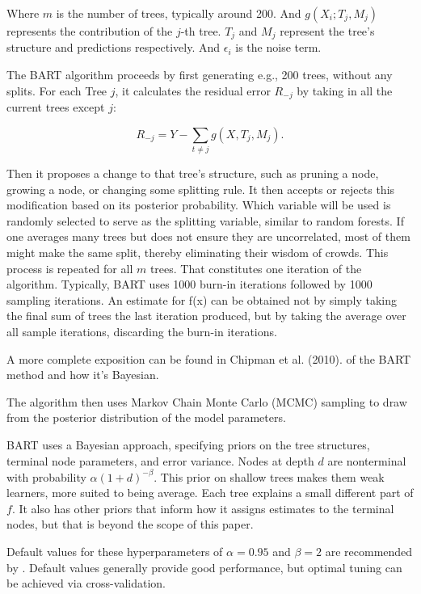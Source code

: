 \documentclass[12pt]{article}
\begin{document}
Where $m$ is the number of trees, typically around 200. And $g(X_i; T_j, M_j)$ represents the contribution of the $j$-th tree. $T_j$ and $M_j$ represent the tree's structure and predictions respectively. And $\epsilon_i$ is the noise term.

The BART algorithm proceeds by first generating e.g., 200 trees, without any splits. For each Tree $j$, it calculates the residual error $R_{-j}$ by taking in all the current trees except $j$:

\begin{equation}
    R_{-j} = Y - \sum_{t\not=j} g(X,T_j,M_j).
\end{equation}

Then it proposes a change to that tree's structure, such as pruning a node, growing a node, or changing some splitting rule. It then accepts or rejects this modification based on its posterior probability. Which variable will be used is randomly selected to serve as the splitting variable, similar to random forests. If one averages many trees but does not ensure they are uncorrelated, most of them might make the same split, thereby eliminating their wisdom of crowds. This process is repeated for all $m$ trees. That constitutes one iteration of the algorithm. Typically, BART uses 1000 burn-in iterations followed by 1000 sampling iterations. An estimate for f(x) can be obtained not by simply taking the final sum of trees the last iteration produced, but by taking the average over all sample iterations, discarding the burn-in iterations.

A more complete exposition can be found in Chipman et al. (2010). of the BART method and how it's Bayesian.

The algorithm then uses Markov Chain Monte Carlo (MCMC) sampling to draw from the posterior distribution of the model parameters.

BART uses a Bayesian approach, specifying priors on the tree structures, terminal node parameters, and error variance. Nodes at depth $d$ are nonterminal with probability $\alpha(1 + d)^{-\beta}$. This prior on shallow trees makes them weak learners, more suited to being average. Each tree explains a small different part of $f$. It also has other priors that inform how it assigns estimates to the terminal nodes, but that is beyond the scope of this paper.

Default values for these hyperparameters of $\alpha = 0.95$ and $\beta = 2$ are recommended by \citep{chipman2010}. Default values generally provide good performance, but optimal tuning can be achieved via cross-validation. %
\end{document}
